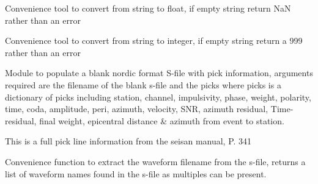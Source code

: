 \documentclass[a4paper,10pt,english]{sphinxmanual}
\begin{document}

\begin{fulllineitems}
\label{modules:Sfile_util.float_conv}
Convenience tool to convert from string to float, if empty string return
NaN rather than an error

\end{fulllineitems}


\begin{fulllineitems}
\label{modules:Sfile_util.int_conv}
Convenience tool to convert from string to integer, if empty string return
a 999 rather than an error

\end{fulllineitems}


\begin{fulllineitems}
\label{modules:Sfile_util.populateSfile}
Module to populate a blank nordic format S-file with pick information,
arguments required are the filename of the blank s-file and the picks
where picks is a dictionary of picks including station, channel,
impulsivity, phase, weight, polarity, time, coda, amplitude, peri, azimuth,
velocity, SNR, azimuth residual, Time-residual, final weight,
epicentral distance \& azimuth from event to station.

This is a full pick line information from the seisan manual, P. 341

\end{fulllineitems}


\begin{fulllineitems}
\label{modules:Sfile_util.readwavename}
Convenience function to extract the waveform filename from the s-file,
returns a list of waveform names found in the s-file as multiples can
be present.

\end{fulllineitems}
\end{document}
